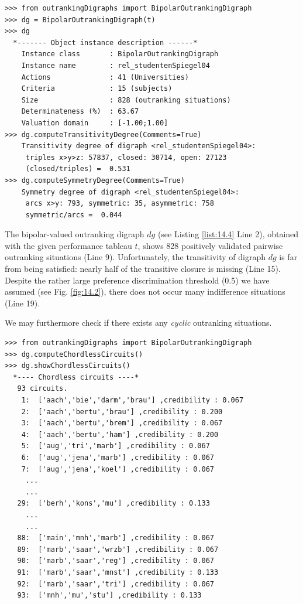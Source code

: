 \begin{lstlisting}[caption={Computing 9-tiles of the enrolment quality scores per subject},label=list:14.4]
>>> from outrankingDigraphs import BipolarOutrankingDigraph
>>> dg = BipolarOutrankingDigraph(t) 
>>> dg
  *------- Object instance description ------*
    Instance class       : BipolarOutrankingDigraph
    Instance name        : rel_studentenSpiegel04
    Actions              : 41 (Universities)
    Criteria             : 15 (subjects)
    Size                 : 828 (outranking situations)
    Determinateness (%)  : 63.67
    Valuation domain     : [-1.00;1.00]
>>> dg.computeTransitivityDegree(Comments=True)
    Transitivity degree of digraph <rel_studentenSpiegel04>:
     triples x>y>z: 57837, closed: 30714, open: 27123
     (closed/triples) =  0.531
>>> dg.computeSymmetryDegree(Comments=True)
    Symmetry degree of digraph <rel_studentenSpiegel04>:
     arcs x>y: 793, symmetric: 35, asymmetric: 758
     symmetric/arcs =  0.044
\end{lstlisting}

The bipolar-valued outranking digraph $dg$ (see Listing \ref{list:14.4} Line 2), obtained with the given performance tableau $t$, shows 828 positively validated pairwise outranking situations (Line 9). Unfortunately, the transitivity of digraph $dg$ is far from being satisfied: nearly half of the transitive closure is missing (Line 15). Despite the rather large preference discrimination threshold (0.5) we have assumed (see Fig. \ref{fig:14.2}), there does not occur many indifference situations (Line 19).

We may furthermore check if there exists any \emph{cyclic} outranking situations.
    
\begin{lstlisting}[caption={Enumerating chordless outranking circuits},label=list:14.5]
>>> from outrankingDigraphs import BipolarOutrankingDigraph
>>> dg.computeChordlessCircuits()
>>> dg.showChordlessCircuits()
  *---- Chordless circuits ----*
   93 circuits.
    1:  ['aach','bie','darm','brau'] ,credibility : 0.067
    2:  ['aach','bertu','brau'] ,credibility : 0.200
    3:  ['aach','bertu','brem'] ,credibility : 0.067
    4:  ['aach','bertu','ham'] ,credibility : 0.200
    5:  ['aug','tri','marb'] ,credibility : 0.067
    6:  ['aug','jena','marb'] ,credibility : 0.067
    7:  ['aug','jena','koel'] ,credibility : 0.067
     ...
     ...
   29:  ['berh','kons','mu'] ,credibility : 0.133
     ...
     ...
   88:  ['main','mnh','marb'] ,credibility : 0.067
   89:  ['marb','saar','wrzb'] ,credibility : 0.067
   90:  ['marb','saar','reg'] ,credibility : 0.067
   91:  ['marb','saar','mnst'] ,credibility : 0.133
   92:  ['marb','saar','tri'] ,credibility : 0.067
   93:  ['mnh','mu','stu'] ,credibility : 0.133
 \end{lstlisting}

